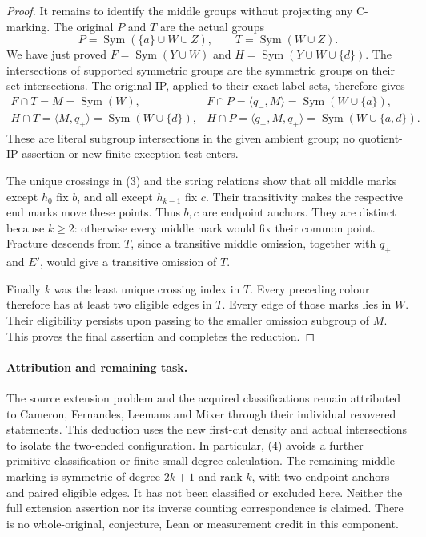 \documentclass[11pt,a4paper]{article}
\newcommand{\gen}[1]{\langle#1\rangle}
\newcommand{\Sym}{\operatorname{Sym}}
\begin{document}
\begin{proof}
It remains to identify the middle groups without projecting
any C-marking. The original $P$ and $T$ are the actual groups
\[
 P=\Sym(\{a\}\cup W\cup Z),\qquad T=\Sym(W\cup Z).
\]
We have just proved
$F=\Sym(Y\cup W)$ and $H=\Sym(Y\cup W\cup\{d\})$.
The intersections of supported symmetric groups are the symmetric
groups on their set intersections. The original IP, applied to
their exact label sets, therefore gives
\[
\begin{array}{ll}
 F\cap T=M=\Sym(W),&
 F\cap P=\gen{q_-,M}=\Sym(W\cup\{a\}),\\
 H\cap T=\gen{M,q_+}=\Sym(W\cup\{d\}),&
 H\cap P=\gen{q_-,M,q_+}=\Sym(W\cup\{a,d\}).
\end{array}
\]
These are literal subgroup intersections in the given ambient
group; no quotient-IP assertion or new finite exception test enters.

The unique crossings in (3) and the string relations show that
all middle marks except $h_0$ fix $b$, and all except $h_{k-1}$
fix $c$. Their transitivity makes the respective end marks move
these points. Thus $b,c$ are endpoint anchors. They are distinct
because $k\ge2$: otherwise every middle mark would fix their
common point. Fracture descends from $T$, since a transitive
middle omission, together with $q_+$ and $E'$, would give a
transitive omission of $T$.

Finally $k$ was the least unique crossing index in $T$.
Every preceding colour therefore has at least two eligible
edges in $T$. Every edge of those marks lies in $W$.
Their eligibility persists upon passing to the smaller omission
subgroup of $M$. This proves the final assertion and completes
the reduction.
\end{proof}

\paragraph{Attribution and remaining task.}
The source extension problem and the acquired classifications remain
attributed to Cameron, Fernandes, Leemans and Mixer through their
individual recovered statements. This deduction uses the new first-cut
density and actual intersections to isolate the two-ended configuration.
In particular, (4) avoids a further primitive classification or finite
small-degree calculation. The remaining middle marking is symmetric
of degree $2k+1$ and rank $k$, with two endpoint anchors and paired
eligible edges. It has not been classified or excluded here. Neither
the full extension assertion nor its inverse counting correspondence
is claimed. There is no whole-original, conjecture, Lean or measurement
credit in this component.
\end{document}
